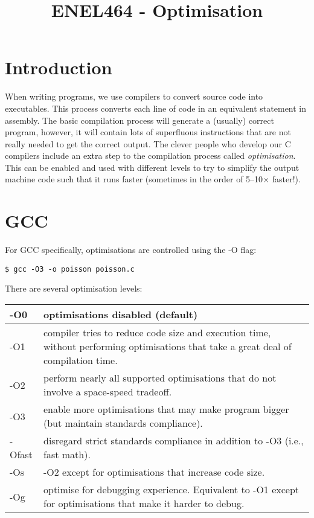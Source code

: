 \documentclass[a4paper,11pt]{article}
\begin{document}
\title{ \bf ENEL464 - Optimisation }
\author{}
\date{}
\maketitle


\section{Introduction}

When writing programs, we use compilers to convert source code into
executables.  This process converts each line of code in an equivalent
statement in assembly.  The basic compilation process will generate a
(usually) correct program, however, it will contain lots of
superfluous instructions that are not really needed to get the correct
output. The clever people who develop our C compilers include an extra
step to the compilation process called \emph{optimisation}. This can
be enabled and used with different levels to try to simplify the
output machine code such that it runs faster (sometimes in the order
of 5--10$\times$ faster!).

\section{GCC}

For GCC specifically, optimisations are controlled using the -O flag:
\begin{verbatim}
$ gcc -O3 -o poisson poisson.c
\end{verbatim}

There are several optimisation levels:

\begin{centering}
    \begin{tabularx}{\linewidth}{ l  X }
        -O0 & optimisations disabled (default) \\ \hline
        -O1 & compiler tries to reduce code size and execution time, without
              performing optimisations that take a great deal of compilation
              time. \\ \hline
        -O2 & perform nearly all supported optimisations that do not involve a
              space-speed tradeoff. \\ \hline
        -O3 & enable more optimisations that may make program bigger (but maintain standards compliance). \\
              \hline
        -Ofast & disregard strict standards compliance in addition to -O3 (i.e.,
                 fast math). \\ \hline
        -Os & -O2 except for optimisations that increase code size. \\ \hline
        -Og & optimise for debugging experience. Equivalent to -O1 except for
              optimisations that make it harder to debug. \\
    \end{tabularx}
\end{centering}
\end{document}
